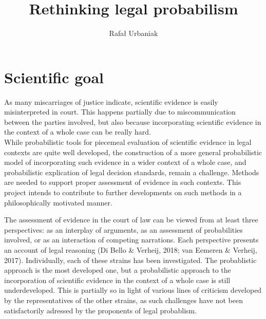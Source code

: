 \documentclass[11pt,dvipsnames,enabledeprecatedfontcommands]{scrartcl}
\title{Rethinking legal probabilism}
\author{Rafał Urbaniak}
\date{}
\begin{document}
\maketitle

\tableofcontents

\thispagestyle{empty}

\section{Scientific goal}\label{scientific-goal}


As many miscarriages of justice indicate, scientific evidence is easily
misinterpreted in court. This happens partially due to miscommunication
between the parties involved, but also because incorporating scientific
evidence in the context of a whole case can be really hard.\\
While probabilistic tools for piecemeal evaluation of scientific
evidence in legal contexts are quite well
developed,
the construction of a more general probabilistic model of incorporating
such evidence in a wider context of a whole case, and probabilistic
explication of legal decision standards, remain a challenge. Methods are
needed to support proper assessment of evidence in such contexts. This
project intends to contribute to further developments on such methods in
a philosophically motivated manner.

The assessment of evidence in the court of law can be viewed from at
least three perspectives: as an interplay of arguments, as an assessment
of probabilities involved, or as an interaction of competing narrations.
Each perspective presents an account of legal reasoning (Di Bello \&
Verheij, 2018; van Eemeren \& Verheij, 2017). Individually, each of
these strains has been investigated. The probablistic approach is the
most developed one, but a probabilistic approach to the incorporation of
scientific evidence in the context of a whole case is still
underdeveloped. This is partially so in light of various lines of
criticism developed by the representatives of the other strains, as such
challenges have not been satisfactorily adressed by the proponents of
legal probablism.
\end{document}
